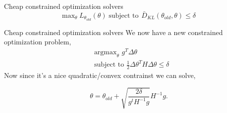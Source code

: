 \documentclass{beamer}
\begin{document}
\begin{frame}{Cheap constrained optimization solvers}
    \begin{equation*}
                \text{max}_{\theta} \hspace{3pt} L_{\theta_{old}}(\theta) \hspace{3pt} 
                 \text{subject to }  \hspace{1pt} \bar{D}_{KL}\left(\theta_{old}, \theta \right) \leq \delta
        \end{equation*}
    
\end{frame}

\begin{frame}{Cheap constrained optimization solvers}
    We now have a new constrained optimization problem, 
    \begin{align*}
        & \text{argmax}_{\theta}\hspace{4pt} g^T \Delta\theta   \\
        & \text{subject to  } \frac{1}{2}\Delta\theta ^TH\Delta\theta \leq \delta
    \end{align*}
Now since it's a nice quadratic/convex contrainst we can solve, 

\begin{equation*}
    \theta = \theta_{old} + \sqrt{\frac{2\delta}{g^tH^{-1}g}} H^{-1}g. 
\end{equation*}
\hyperlink{done_deriv}{}
\end{frame}
\end{document}
